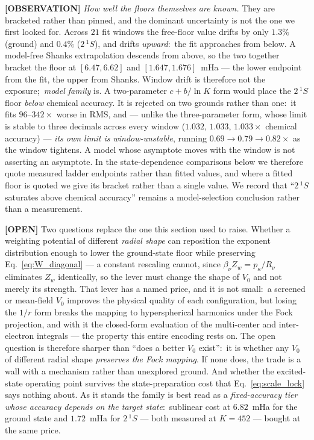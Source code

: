 \documentclass[aps,pra,twocolumn,superscriptaddress,longbibliography]{revtex4-2}
\newcommand{\gvq}[2]{#2}
\begin{document}
\textbf{[OBSERVATION]} \emph{How well the floors themselves are known.}  They
are bracketed rather than pinned, and the dominant uncertainty is not the one we
first looked for.  Across $21$ fit windows the free-floor value drifts by only
$1.3\%$ (ground) and $0.4\%$ ($2\,^{1}S$), and drifts \emph{upward}:\ the fit
approaches from below.  A model-free Shanks extrapolation descends from above,
so the two together bracket the floor at $[6.47,6.62]$ and
$[1.647,1.676]$~mHa --- the lower endpoint from the fit, the upper from Shanks.
Window drift is therefore not the exposure;\ \emph{model family} is.  A
two-parameter $c+b/\ln K$ form would place the $2\,^{1}S$ floor \emph{below}
chemical accuracy.  It is rejected on two grounds rather than one:\ it fits
$96$--$342\times$ worse in RMS, and --- unlike the three-parameter form, whose
limit is stable to three decimals across every window ($1.032$, $1.033$,
$1.033\times$ chemical accuracy) --- \emph{its own limit is window-unstable},
running $0.69\to0.79\to0.82\times$ as the window tightens.  A model whose
asymptote moves with the window is not asserting an asymptote.  In the state-dependence
comparisons below we therefore quote measured ladder endpoints rather than
fitted values, and where a fitted floor is quoted we give its bracket rather
than a single value.  We record
that ``$2\,^{1}S$ saturates above chemical accuracy'' remains a model-selection
conclusion rather than a measurement.

\textbf{[OPEN]} Two questions replace the one this section used to raise.
Whether a weighting potential of different \emph{radial shape} can reposition
the exponent distribution enough to lower the ground-state floor while
preserving Eq.~\eqref{eq:W_diagonal} --- a constant rescaling cannot, since
$\beta_\nu Z_w = p_\kappa/R_\nu$ eliminates $Z_w$ identically, so the lever must
change the shape of $V_0$ and not merely its strength.  That lever has a named
price, and it is not small:\ a screened or mean-field $V_0$ improves the physical
quality of each configuration, but losing the $1/r$ form breaks the mapping to
hyperspherical harmonics under the Fock projection, and with it the closed-form
evaluation of the multi-center and inter-electron integrals --- the property this
entire encoding rests on.  The open question is therefore sharper than ``does a
better $V_0$ exist'':\ it is whether any $V_0$ of different radial shape
\emph{preserves the Fock mapping}.  If none does, the trade is a wall with a
mechanism rather than unexplored ground.  And whether the
excited-state operating point survives the state-preparation cost that
Eq.~\eqref{eq:scale_lock} says nothing about.  As it stands the family is best
read as a \emph{fixed-accuracy tier whose accuracy depends on the target
state}:\ sublinear cost at $\gvq{p60_gnd_gap_k452}{6.82}$~mHa for the ground
state and $\gvq{p60_exc_gap_k452}{1.72}$~mHa for $2\,^{1}S$ --- both measured at
$K=452$ --- bought at the same price.
\end{document}

